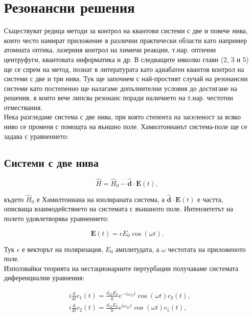 \chapter{Резонансни решения}

    Съществуват редица методи за контрол на квантови системи с две и повече нива, които често намират приложение в различни практически области като например атомната оптика, лазерния контрол на химичи реакции, т.нар. оптични центруфуги,
    квантовата информатика и др. В следващите няколко глави (2, 3 и 5) ще се спрем на метод, познат в литературата като адиабатен квантов контрол на системи с две и три нива. Тук ще започнем с най-простият случай на резонансни системи като
    постепенно ще налагаме допълнителни условия до достигане на решения, в които вече липсва резонанс поради наличието на т.нар. честотни отмествания.\\
    Нека разгледаме система с две нива, при която степента на заселеност за всяко ниво се променя с помощта на външно поле. Хамилтонианът система-поле ще се задава с уравнението:
    
    \section{Системи с две нива}

    \begin{equation}
        \hat{H} = \hat{H}_0 - \hat{\textbf{d}}\cdot \textbf{E}(t),
    \end{equation}

    където $\hat{H}_0$ е Хамилтониана на изолираната система, а $\hat{\textbf{d}}\cdot \textbf{E}(t)$ е частта, описваща взаимодействието на системата с външното поле. Интензитетът на полето удовлетворява уравнението:
    
    \begin{equation}
        \textbf{E}(t) = \textbf{$\epsilon$} E_0 \cos(\omega t).
    \end{equation}

    Тук \textbf{$\epsilon$} е векторът на поляризация, $E_0$ амплитудата, а $\omega$ честотата на приложеното поле.\\
    Използвайки теорията на нестационарните пертурбации получаваме системата диференциални уравнения: 
    
    \begin{subequations}
        \begin{align}
            & \textit{i}\frac{d}{dt}c_1(t) = \frac{d_{12}E_0}{\hbar}e^{-\textit{i}\omega_{21} t}\cos(\omega t)c_2(t),\\
            & \textit{i}\frac{d}{dt}c_2(t) = \frac{d_{12}E_0}{\hbar}e^{\textit{i}\omega_{21} t}\cos(\omega t)c_1(t),
        \end{align}
    \end{subequations}

